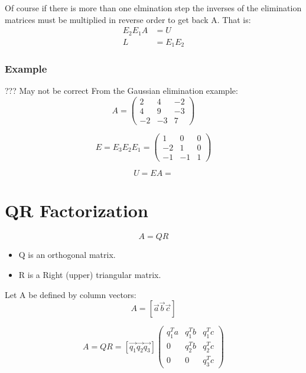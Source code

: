 \documentclass[12pt]{article}
\begin{document}
Of course if there is more than one elmination step the inverses of the elimination matrices must be multiplied in reverse order to get back A. That is:
\begin{align*}
E_2 E_1 A &= U\\
L &= E_1 E_2
\end{align*}

\subsubsection{Example}
??? May not be correct
From the Gaussian elimination example:
\begin{equation*}
A =
\begin{pmatrix}
2&4&-2\\
4&9&-3\\
-2&-3&7 
\end{pmatrix}
\end{equation*}

\begin{equation*}
E = E_3 E_2 E_1 = 
\begin{pmatrix}
1&0&0\\
-2&1&0\\
-1&-1&1 
\end{pmatrix}
\end{equation*}

\begin{equation*}
U = EA = 
\end{equation*}



\section{QR Factorization}
\begin{equation*}
A = QR
\end{equation*}

\begin{itemize}
\item Q is an orthogonal matrix.
\item R is a Right (upper) triangular matrix.
\end{itemize}

Let A be defined by column vectors:
\begin{equation*}
A = [\overrightarrow{a} \overrightarrow{b} \overrightarrow{c}] 
\end{equation*}



\begin{equation*}
A = QR = [\overrightarrow{q_1} \overrightarrow{q_2} \overrightarrow{q_3}] \begin{pmatrix} q_1^Ta&q_1^Tb&q_1^Tc\\0&q_2^Tb&q_2^Tc\\0&0&q_3^Tc \end{pmatrix}
\end{equation*}
\end{document}

